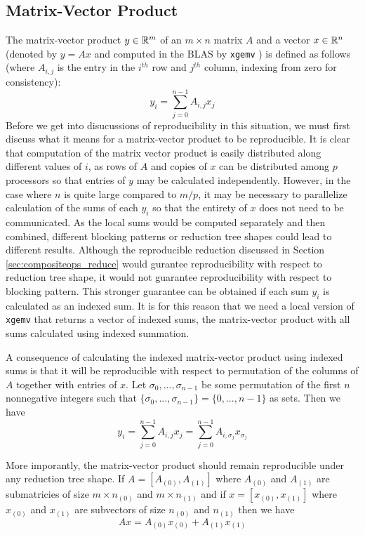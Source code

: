 \subsection{Matrix-Vector Product}
  \label{sec:compositeops_gemv}
  The matrix-vector product $y \in \mathbb{R}^m$ of an $m \times n$ matrix $A$ and a vector $x \in \mathbb{R}^n$ (denoted by $y = Ax$ and computed in the BLAS by \texttt{xgemv} \cite{BLAS}) is defined as follows (where $A_{i, j}$ is the entry in the $i^{th}$ row and $j^{th}$ column, indexing from zero for consistency):
  \[
    y_i = \sum\limits_{j = 0}^{n - 1} A_{i, j}x_j
  \]
  Before we get into disucussions of reproducibility in this situation, we must first discuss what it means for a matrix-vector product to be reproducible.
  It is clear that computation of the matrix vector product is easily distributed along different values of $i$, as rows of $A$ and copies of $x$ can be distributed among $p$ processors so that entries of $y$ may be calculated independently.
  However, in the case where $n$ is quite large compared to $m/p$, it may be necessary to parallelize calculation of the sums of each $y_i$ so that the entirety of $x$ does not need to be communicated.
  As the local sums would be computed separately and then combined, different blocking patterns or reduction tree shapes could lead to different results.
  Although the reproducible reduction discussed in Section \ref{sec:compositeops_reduce} would gurantee reproducibility with respect to reduction tree shape, it would not guarantee reproducibility with respect to blocking pattern. This stronger guarantee can be obtained if each sum $y_i$ is calculated as an indexed sum.
  It is for this reason that we need a local version of \texttt{xgemv} that returns a vector of indexed sums, the matrix-vector product with all sums calculated using indexed summation.

  A consequence of calculating the indexed matrix-vector product using indexed sums is that it will be reproducible with respect to permutation of the columns of $A$ together with entries of $x$.
  Let $\sigma_0, ..., \sigma_{n - 1}$ be some permutation of the first $n$ nonnegative integers such that $\{\sigma_0, ..., \sigma_{n - 1}\} = \{0, ..., n - 1\}$ as sets. Then we have
  \[
    y_i = \sum\limits_{j = 0}^{n - 1} A_{i, j}x_j = \sum\limits_{j = 0}^{n - 1} A_{i, \sigma_j}x_{\sigma_j}
  \]

  More imporantly, the matrix-vector product should remain reproducible under any reduction tree shape.
  If $A = [A_{(0)}, A_{(1)}]$ where $A_{(0)}$ and $A_{(1)}$ are submatricies of size $m \times n_{(0)}$ and $m \times n_{(1)}$ and if $x = [x_{(0)}, x_{(1)}]$ where $x_{(0)}$ and $x_{(1)}$ are subvectors of size $n_{(0)}$ and $n_{(1)}$ then we have 
  \[
    Ax = A_{(0)}x_{(0)} + A_{(1)}x_{(1)}
  \]

